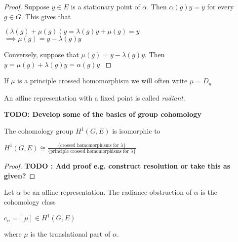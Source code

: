 \begin{proof}
    Suppose $y \in E$ is a stationary point of $\alpha$. Then $\alpha(g)y = y$ for every $g \in G$.
    This gives that
    \begin{center}
        $(\lambda(g) + \mu(g))y = \lambda(g)y + \mu(g) = y$\\
        $ \implies \mu(g) = y - \lambda(g)y$
    \end{center}

    Conversely, suppose that $\mu(g) = y - \lambda(g)y$. Then $y = \mu(g) +
        \lambda(g)y = \alpha(g)y$ \label{lemma:stationary}
\end{proof}
\begin{remark}
    If $\mu$ is a principle crossed homomorphism we will often write $\mu = D_y$
\end{remark}

\begin{remark}
    An affine representation with a fixed point is called \textit{radiant}.
\end{remark}

\textbf{TODO: Develop some of the basics of group cohomology}

\begin{lemma}
    The cohomology group $H^1(G, E)$ is isomorphic to
    \begin{center}
        $H^1(G,E) \cong \frac{\{\text{crossed homomorphisms for } \lambda\}}{\{\text{principle crossed homomorphisms for } \lambda\}}$
    \end{center}
\end{lemma}

\begin{proof}
    \textbf{TODO : Add proof e.g. construct resolution or take this as given?}
\end{proof}

\begin{definition}
    Let $\alpha$ be an affine representation. The radiance obstruction of $\alpha$ is the cohomology
    class
    \begin{center}
        $c_{\alpha} = [\mu] \in H^1(G, E)$
    \end{center}
    where $\mu$ is the translational part of $\alpha$.
\end{definition}

